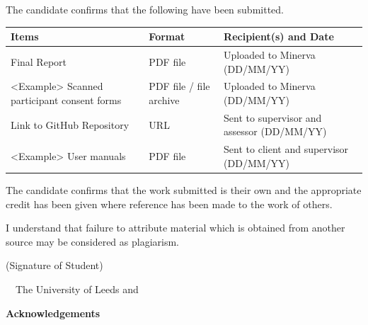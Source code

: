 \frontcover

\clearpage

\noindent The candidate confirms that the following have been submitted.\\


\begin{table}[ht!]
\begin{tabular}{|p{}|p{}|p{}|}
\hline 
Items & Format & Recipient(s) and Date \\ 
\hline 
Final Report & PDF file & Uploaded to Minerva (DD/MM/YY) \\ 
\hline 
<Example> Scanned participant consent forms & PDF file / file archive & Uploaded to Minerva (DD/MM/YY) \\ 
\hline 
Link to GitHub Repository & URL & Sent to supervisor and assessor (DD/MM/YY) \\ 
\hline 
<Example> User manuals & PDF file & Sent to client and supervisor (DD/MM/YY) \\ 
\hline 
\end{tabular} 
\end{table}


\vfill

\noindent The candidate confirms that the work submitted is their own and the appropriate credit has been given where reference has been made to the work of others.

\vfill

\noindent I understand that failure to attribute material which is obtained from another source may be considered as plagiarism.

\vfill

\flushright(Signature of Student) %
\flushleft

\vfill

\textcopyright~\session~The University of Leeds and~\fullname

\begin{dissertationsummary}

\end{dissertationsummary}

\clearpage
\centering\textbf{Acknowledgements}
\flushleft


\tableofcontents

\clearpage

